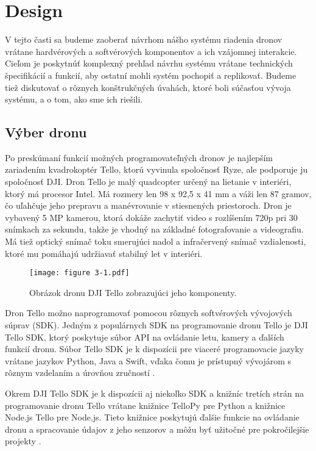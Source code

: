 \section{Design}
V tejto časti sa budeme zaoberať návrhom nášho systému riadenia dronov vrátane hardvérových a softvérových komponentov a ich vzájomnej interakcie. Cieľom je poskytnúť komplexný prehľad návrhu systému vrátane technických špecifikácií a funkcií, aby ostatní mohli systém pochopiť a replikovať. Budeme tiež diskutovať o rôznych konštrukčných úvahách, ktoré boli súčasťou vývoja systému, a o tom, ako sme ich riešili.

\subsection{Výber dronu}
Po preskúmaní funkcií možných programovateľných dronov je najlepším zariadením kvadrokoptér Tello, ktorú vyvinula spoločnosť Ryze, ale podporuje ju spoločnosť DJI. Dron Tello je malý quadcopter určený na lietanie v interiéri, ktorý má procesor Intel. Má rozmery len 98 x 92,5 x 41 mm a váži len 87 gramov, čo uľahčuje jeho prepravu a manévrovanie v stiesnených priestoroch. Dron je vybavený 5 MP kamerou, ktorá dokáže zachytiť video s rozlíšením 720p pri 30 snímkach za sekundu, takže je vhodný na základné fotografovanie a videografiu. Má tiež optický snímač toku smerujúci nadol a infračervený snímač vzdialenosti, ktoré mu pomáhajú udržiavať stabilný let v interiéri.

\begin{figure}[ht!]
    \centering
    \texttt{[image: figure 3-1.pdf]}
    \caption{Obrázok dronu DJI Tello zobrazujúci jeho komponenty.}
    \label{o:3-1}
\end{figure} 

Dron Tello možno naprogramovať pomocou rôznych softvérových vývojových súprav (SDK). Jedným z populárnych SDK na programovanie dronu Tello je DJI Tello SDK, ktorý poskytuje súbor API na ovládanie letu, kamery a ďalších funkcií dronu. Súbor Tello SDK je k dispozícii pre viaceré programovacie jazyky vrátane jazykov Python, Java a Swift, vďaka čomu je prístupný vývojárom s rôznym vzdelaním a úrovňou zručností .

Okrem DJI Tello SDK je k dispozícii aj niekoľko SDK a knižníc tretích strán na programovanie dronu Tello vrátane knižnice TelloPy pre Python a knižnice Node.js Tello pre Node.js. Tieto knižnice poskytujú ďalšie funkcie na ovládanie dronu a spracovanie údajov z jeho senzorov a môžu byť užitočné pre pokročilejšie projekty .

